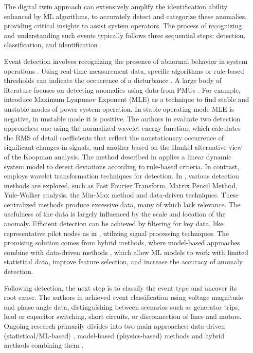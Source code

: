The digital twin approach can extensively amplify the identification ability enhanced by ML algorithms, to accurately detect and categorize these anomalies, providing critical insights to assist system operators. The process of recognizing and understanding such events typically follows three sequential steps: detection, classification, and identification \autocite{Chandola2009}.

Event detection involves recognizing the presence of abnormal behavior in system operations \autocite{Chandola2009}. Using real-time measurement data, specific algorithms or rule-based thresholds can indicate the occurrence of a disturbance \autocite{ma2018clsf, 0cba72bc98634e678681cd57ee34bc59, 6465867}. A large body of literature focuses on detecting anomalies using data from PMUs \autocite{ASEFI2023101116, 6345522, 8274161, 10295481, hannon2019anml}. For example, \autocite{6345522, vasiliev2024mle} introduce Maximum Lyapunov Exponent (MLE) as a technique to find stable and unstable modes of power system operation. In stable operating mode MLE is negative, in unstable mode it is positive. The authors in \autocite{8274161, 10295481} evaluate two detection approaches: one using the normalized wavelet energy function, which calculates the RMS of detail coefficients that reflect the nonstationary occurrence of significant changes in signals, and another based on the Hankel alternative view of the Koopman analysis. The method described in \autocite{7511666} applies a linear dynamic system model to detect deviations according to rule-based criteria. In contrast, \autocite{Mampilly2024, 8274161} employs wavelet transformation techniques for detection. In \autocite{8831027cd83c49519d85cab789591467}, various detection methods are explored, such as Fast Fourier Transform, Matrix Pencil Method, Yule-Walker analysis, the Min-Max method and data-driven techniques. These centralized methods produce excessive data, many of which lack relevance. The usefulness of the data is largely influenced by the scale and location of the anomaly. Efficient detection can be achieved by filtering for key data, like representative pilot nodes as in \autocite{8117615,6465867}, utilizing signal processing techniques. The promising solution comes from hybrid methods, where model-based approaches combine with data-driven methods \autocite{ASEFI2023101116}, which allow ML models to work with limited statistical data, improve feature selection, and increase the accuracy of anomaly detection.

Following detection, the next step is to classify the event type and uncover its root cause. The authors in \autocite{7540867} achieved event classification using voltage magnitude and phase angle data, distinguishing between scenarios such as generator trips, load or capacitor switching, short circuits, or disconnection of lines and motors. Ongoing research primarily divides into two main approaches: data-driven (statistical/ML-based) \autocite{biau2015randomforestguidedtour, Hochreiter_1997}, model-based (physics-based) methods \autocite{7511666,4596578} and hybrid methods combining them \autocite{ASEFI2023101116, vasiliev2024mle}.

